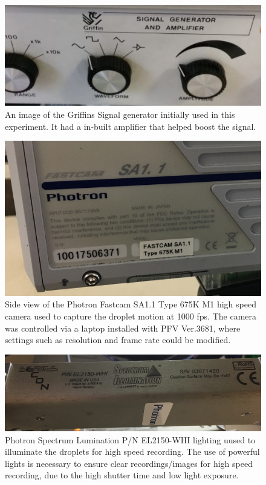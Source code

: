 \begin{figure}[ht]
\includegraphics[width=12cm]{prototype/exp_rep_imgs/griffinsSigGen.jpg}
\centering
\caption{An image of the Griffins Signal generator initially used in this experiment. It had a in-built amplifier that helped boost the signal.}
\centering
\label{griffinsSigGen}
\end{figure}

\begin{figure}[ht]
\includegraphics[width=12cm]{prototype/exp_rep_imgs/PhotronHighSpeedCamera.jpg}
\centering
\caption{Side view of the Photron Fastcam SA1.1 Type 675K M1 high speed camera used to capture the droplet motion at 1000 fps. The camera was controlled via a laptop installed with PFV Ver.3681, where settings such as resolution and frame rate could be modified.}
\centering
\label{}
\end{figure}

\begin{figure}[ht]
\includegraphics[width=12cm]{prototype/exp_rep_imgs/PhotronLighting.jpg}
\centering
\caption{Photron Spectrum Lumination P/N EL2150-WHI lighting uused to illuminate the droplets for high speed recording. The use of powerful lights is necessary to ensure clear recordings/images for high speed recording, due to the high shutter time and low light exposure.}
\centering
\label{}
\end{figure}

